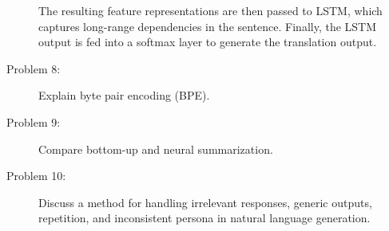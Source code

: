 \documentclass[10pt]{article}
\begin{document}
\begin{description}
The resulting feature representations are then passed to LSTM, which captures long-range dependencies in the sentence.
Finally, the LSTM output is fed into a softmax layer to generate the translation output.

\pagebreak

\item[Problem 8:]  Explain byte pair encoding (BPE).

\pagebreak

\item[Problem 9:]  Compare bottom-up and neural summarization.

\pagebreak

\item[Problem 10:]  Discuss a method for handling irrelevant responses, generic outputs, repetition, and inconsistent persona in natural language generation.


\end{description}
\end{document}
